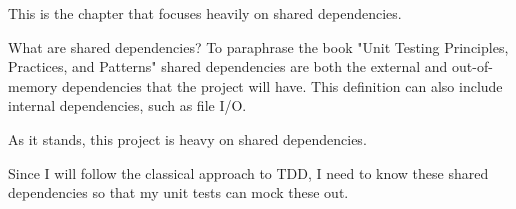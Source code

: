 \label{ch:shared}

This is the chapter that focuses heavily on shared dependencies. 

What are shared dependencies? To paraphrase the book "Unit Testing Principles, Practices, and Patterns" shared dependencies are both the external and out-of-memory dependencies that the project will have. This definition can also include internal dependencies, such as file I/O.

As it stands, this project is heavy on shared dependencies.

Since I will follow the classical approach to TDD, I need to know these shared dependencies so that my unit tests can mock these out.